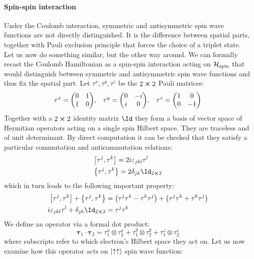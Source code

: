 \paragraph{Spin-spin interaction}Under the Coulomb interaction, symmetric and antisymmetric spin wave functions are not
directly distinguished. It is the difference between spatial parts, together with Pauli
exclusion principle that forces the choice of a triplet state. Let us now do something
similar, but the other way around. We can formally recast the Coulomb Hamiltonian as a
spin-spin interaction acting on \(\mathcal{H}_{\textrm{spin}}\) that would distinguish
between symmetric and antisymmetric spin wave functions and thus fix the spatial part.
Let \(\tau^x,\tau^y,\tau^z\) be the \(2\cross 2\) Pauli matrices:
\begin{equation}
\tau^x = \mqty(\pmat{1}),\;\;\;\tau^y = \mqty(\pmat{2}),\;\;\;\tau^z= \mqty(\pmat{3})
\label{eq:Pauli matrices}
\end{equation}
Together with a \(2\cross 2\) identity matrix \(\Id\) they form a basis of vector space of
Hermitian operators acting on a single spin Hilbert space.
They are traceless and of unit determinant. By direct computation it can be checked that
they satisfy a particular commutation and anticommutation relations:
\begin{align}
    &\comm{\tau^j}{\tau^k} = 2 i \varepsilon_{jkl}\tau^{l}\\
    &\anticommutator{\tau^j}{\tau^k} = 2 \delta_{jk} \Id_{2\cross 2}
\end{align}
which in turn leads to the following important property:
\begin{align}
        \comm{\tau^{j}}{\tau^{k}} + \anticommutator{\tau^{j}}{\tau^{k}} 
    &=\left(\tau^{j} \tau^{k}-\tau^{k} \tau^{j}\right)+\left(\tau^{j} \tau^{k}+\tau^{k} 
    \tau^{j}\right) \nonumber \\
    i \varepsilon_{j k l} \tau^{l}+\delta_{j k} \Id_{2\cross 2} &= \tau^{j} \tau^{k}
\end{align}
We define an operator via a formal dot product:
\begin{equation}
    \bm{\tau}_1 \cdot \bm{\tau}_2 = \tau_1^x \otimes \tau_2^x + \tau_1^y \otimes \tau_2^y +
    \tau_1^z \otimes \tau_2^z  
\end{equation}
where subscripts refer to which electron's Hilbert space they act on. 
Let us now examine how this operator acts on \(\ket{\uparrow\uparrow}\) spin wave function:
